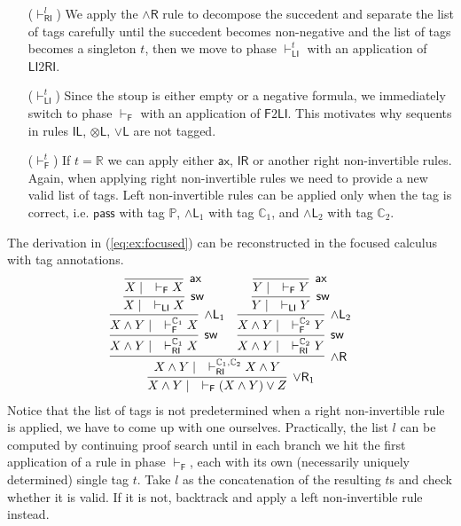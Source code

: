 \documentclass[submission,copyright,creativecommons]{eptcs}
\theoremstyle{definition}
\newcommand{\tl}{\otimes \mathsf{L}}
\newcommand{\pass}{\mathsf{pass}}
\newcommand{\unitl}{\mathsf{IL}}
\newcommand{\unitr}{\mathsf{IR}}
\newcommand{\andlone}{\land \mathsf{L}_{1}}
\newcommand{\andltwo}{\land \mathsf{L}_{2}}
\newcommand{\andr}{\land \mathsf{R}}
\newcommand{\orl}{\lor \mathsf{L}}
\newcommand{\orrone}{\lor \mathsf{R}_{1}}
\newcommand{\ax}{\mathsf{ax}}
\newcommand{\RI}{\mathsf{RI}}
\newcommand{\LI}{\mathsf{LI}}
\newcommand{\Pass}{\mathsf{P}}
\newcommand{\F}{\mathsf{F}}
\newcommand{\sw}{\mathsf{sw}}
\newcommand{\tP}{\mathbb{P}}
\newcommand{\tCone}{\mathbb{C}_1}
\newcommand{\tCtwo}{\mathbb{C}_2}
\newcommand{\tE}{\mathbb{R}}
\begin{document}
\begin{itemize}
  \item[($\vdash^{l}_{\RI}$)] We apply the $\andr$ rule to decompose the succedent and separate the list of tags carefully until the succedent becomes non-negative and the list of tags becomes a singleton $t$, then we move to phase $\vdash_\LI^t$ with an application of $\LI2 \RI$.
  \item[($\vdash^{t}_{\LI}$)] Since the stoup is either empty or a negative formula, we immediately switch to phase $\vdash_\F$ with an application of $\F 2 \LI$. This motivates why sequents in rules $\unitl$, $\tl$, $\orl$ are not tagged.
  \item[($\vdash^{t}_{\F}$)] If $t = \tE$ we can apply either $\ax$, $\unitr$ or another right non-invertible rules. Again, when applying right non-invertible rules we need to provide a new valid list of tags.
  Left non-invertible rules can be applied only when the tag is correct, i.e. $\pass$ with tag $\tP$, $\andlone$ with tag $\tCone$, and $\andltwo$ with tag $\tCtwo$.
\end{itemize}
The derivation in (\ref{eq:ex:focused}) can be reconstructed in the focused calculus with tag annotations.
\begin{equation}\label{eq:ex:tag:focused}
  \begin{array}{c}
  \infer[\orrone]{X \land Y \mid \quad \vdash_{\F} (X \land Y) \lor Z}{
    \infer[\andr]{X \land Y \mid \quad \vdash^{\tCone , \tCtwo}_{\RI} X \land Y}{
      \infer[\sw]{X \land Y \mid \quad \vdash^{\tCone}_{\RI} X}{
        \infer[\andlone]{X \land Y \mid \quad \vdash^{\tCone}_{\F} X}{
          \infer[\sw]{X \mid \quad \vdash_{\LI} X}{
            \infer[\ax]{X \mid \quad \vdash_{\F} X}{}
          }
        }
      }
      &
      \infer[\sw]{X \land Y \mid \quad \vdash^{\tCtwo}_{\RI} Y}{
        \infer[\andltwo]{X \land Y \mid \quad \vdash^{\tCtwo}_{\F} Y}{
          \infer[\sw]{Y \mid \quad \vdash_{\LI} Y}{
            \infer[\ax]{Y \mid \quad \vdash_{\F} Y}{}
          }
        }
      }
    }
  }
  \end{array}
\end{equation}
Notice that the list of tags is not predetermined when a right non-invertible rule is applied, we have to come up with one ourselves.
Practically, the list $l$ can be computed by continuing proof search until in each branch we hit the first application of a rule in phase $\vdash_\F$, each with its own (necessarily uniquely determined) single tag $t$. Take $l$ as the concatenation of the resulting $t$s and check whether it is valid. If it is not, backtrack and apply a left non-invertible rule instead.
\end{document}
